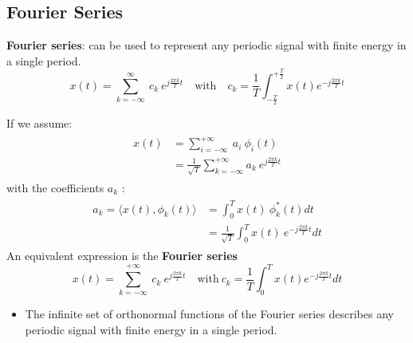 \subsection{Fourier Series}
\textbf{Fourier series}: can be used to represent any periodic signal with finite energy in a single period. 
\[ x(t) =  \sum_{k=-\infty}^{\infty} \ c_{k} \ e^{j\frac{2\pi k}{T}t} \quad \text{with} \quad c_{k} = \frac{1}{T} \int_{-\frac{T}{2}}^{+\frac{T}{2}} x(t)e^{-j\frac{2\pi k}{T}t} \]


\begin{dv}{}
If we assume:
\begin{align*}\begin{split}
 x(t) &= \sum_{i=-\infty}^{+\infty} \ a_{i} \ \phi_{i}(t) \\
&= \frac{1}{\sqrt{T}} \sum_{k=-\infty}^{+\infty} a_{k} \ e^{j\frac{2\pi k}{T}t}
\end{split} \end{align*}
with the coefficients $a_{k}$ :
\begin{align*}\begin{split}
a_{k} = \langle x(t), \phi_{k}(t) \rangle &=  \int_{0}^{T} x(t)\ \phi_{k}^{*}(t)dt \\
&=  \frac{1}{\sqrt{T}} \int_{0}^{T} x(t)\ e^{-j\frac{2\pi k}{T}t} dt 
\end{split} \end{align*}
An equivalent expression is the \textbf{Fourier series}
\[ x(t) =  \sum_{k=-\infty}^{+\infty} \ c_{k} \ e^{j\frac{2\pi k}{T}t} \quad \text{with} \ c_{k} = \frac{1}{T} \int_{0}^{T} x(t)e^{-j\frac{2\pi k}{T}t} dt \]
\end{dv}

\begin{itemize}
    \item The infinite set of orthonormal functions of the Fourier series describes any periodic signal with finite energy in a single period.
\end{itemize}


